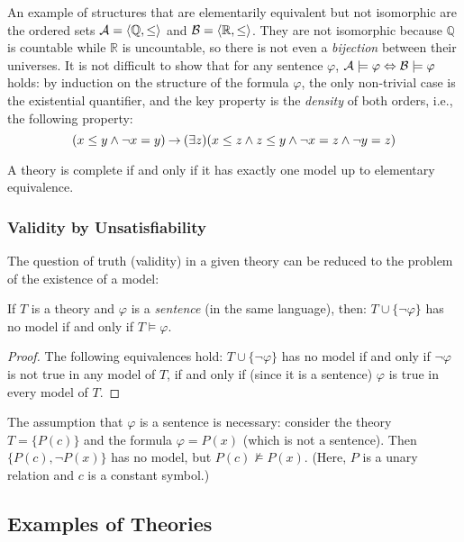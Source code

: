 \begin{example}\label{example:elementary-equivalence-of-orders-R-Q}
    An example of structures that are elementarily equivalent but not isomorphic are the ordered sets $\mathcal{A}=\langle\mathbb Q,\leq\rangle$ and $\mathcal{B}=\langle\mathbb R,\leq\rangle$. They are not isomorphic because $\mathbb Q$ is countable while $\mathbb R$ is uncountable, so there is not even a \emph{bijection} between their universes. It is not difficult to show that for any sentence $\varphi$, $\mathcal{A}\models\varphi\Leftrightarrow\mathcal{B}\models\varphi$ holds: by induction on the structure of the formula $\varphi$, the only non-trivial case is the existential quantifier, and the key property is the \emph{density} of both orders, i.e., the following property:
    $$
    (x\leq y\land \neg x=y)\mathbin{\rightarrow}(\exists z)(x\leq z\land z\leq y\land \neg x=z\land\neg y=z)
    $$

\end{example}
\begin{observation}
    A theory is complete if and only if it has exactly one model up to elementary equivalence.    
\end{observation}

\subsubsection{Validity by Unsatisfiability}

The question of truth (validity) in a given theory can be reduced to the problem of the existence of a model:
\begin{proposition}
    If $T$ is a theory and $\varphi$ is a \emph{sentence} (in the same language), then: $T\cup\{\neg\varphi\}$ has no model if and only if $T\models\varphi$.
\end{proposition}
\begin{proof}
    The following equivalences hold: $T\cup\{\neg\varphi\}$ has no model if and only if $\neg\varphi$ is not true in any model of $T$, if and only if (since it is a sentence) $\varphi$ is true in every model of $T$. 
\end{proof}

The assumption that $\varphi$ is a sentence is necessary: consider the theory $T=\{P(c)\}$ and the formula $\varphi=P(x)$ (which is not a sentence). Then $\{P(c),\neg P(x)\}$ has no model, but $P(c)\not\models P(x)$. (Here, $P$ is a unary relation and $c$ is a constant symbol.)

\subsection{Examples of Theories}

